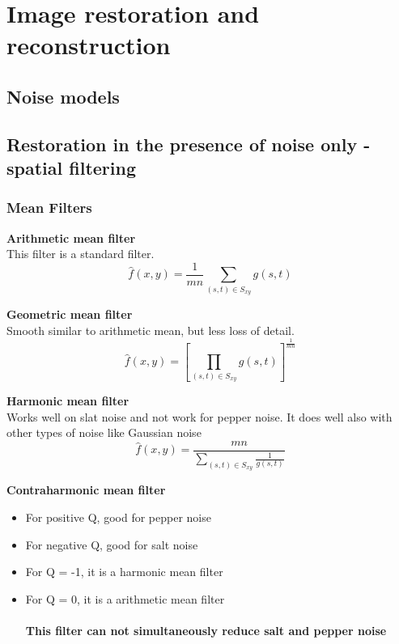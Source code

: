 \section{Image restoration and reconstruction}
\subsection{Noise models}

\subsection{Restoration in the presence of noise only - spatial filtering}
\subsubsection{Mean Filters}

\textbf{Arithmetic mean filter}\\
This filter is a standard filter.
\begin{equation}
	\hat{f}(x,y)= \frac{1}{m  n} \sum\limits_{(s,t)\in S_{xy}}g(s,t)
\end{equation}

\textbf{Geometric mean filter}\\
Smooth similar to arithmetic mean, but less loss of detail.
\begin{equation}
	\hat{f}(x,y)= \left[\prod\limits_{(s,t)\in S_{xy}} g(s,t)\right]^\frac{1}{mn}
\end{equation}

\textbf{Harmonic mean filter}\\
Works well on slat noise and not work for pepper noise. It does well also with other types of noise like Gaussian noise
\begin{equation}
	\hat{f}(x,y)= \frac{mn}{\sum\limits_{(s,t)\in S_{xy}} \frac{1}{g(s,t)}}
\end{equation}

\textbf{Contraharmonic mean filter}\\
\begin{itemize}
\item For positive Q, good for pepper noise
\item For negative Q, good for salt noise
\item For Q = -1, it is a harmonic mean filter
\item For Q = 0, it is a arithmetic mean filter\\ \\
\textbf{This filter can not simultaneously reduce salt and pepper noise}
\end{itemize}

